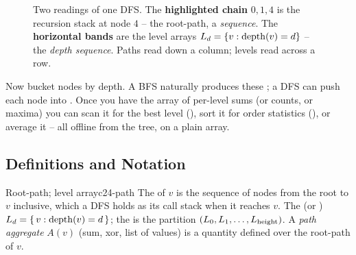 \begin{figure}[H]
\centering
{}
\caption{Two readings of one DFS. The \textbf{highlighted chain} $0,1,4$ is the recursion
stack at node $4$ -- the root-path, a \emph{sequence}. The \textbf{horizontal bands} are the
level arrays $L_d=\{v:\operatorname{depth}(v)=d\}$ -- the \emph{depth sequence}. Paths read down a column;
levels read across a row.}\label{fig:c24-path}
\end{figure}

Now bucket nodes by depth. A BFS naturally produces these ; a DFS can push
each node into . Once you have the array of per-level sums (or
counts, or maxima) you can scan it for the best level (), sort it for
order statistics (), or average it -- all offline from the tree, on a
plain array.

\subsection{Definitions and Notation}

\begin{definition}{Root-path; level array}{c24-path}
The  of $v$ is the sequence of nodes from the root to $v$ inclusive, which a
DFS holds as its call stack when it reaches $v$. The  (or )
$L_d = \{\, v : \operatorname{depth}(v) = d \,\}$; the  is the partition
$(L_0, L_1, \dots, L_{\operatorname{height}})$. A \emph{path aggregate} $A(v)$ (sum, xor, list of values) is
a quantity defined over the root-path of $v$.
\end{definition}


